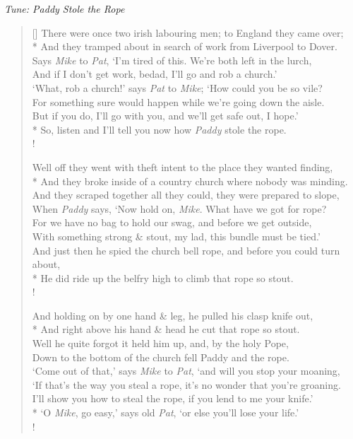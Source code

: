 \documentclass[MAIN]{subfiles}
\begin{document}
\begin{center}
\emph{Tune: Paddy Stole the Rope}
\end{center}

\bigskip

\settowidth{\versewidth}{There were once two irish labouring men; to England they came over;}
\begin{verse}[\versewidth]
There were once two irish labouring men; to England they came over;\\*
And they tramped about in search of work from {\sc Liverpool} to {\sc Dover}.\\
Says \emph{Mike} to \emph{Pat}, `I'm tired of this. We're both left in the lurch,\\
And if I don't get work, bedad, I'll go and rob a church.'\\
`What, rob a church!' says \emph{Pat} to \emph{Mike}; `How could you be so vile?\\
For something sure would happen while we're going down the aisle.\\
But if you do, I'll go with you, and we'll get safe out, I hope.'\\*
So, listen and I'll tell you now how \emph{Paddy} stole the rope.\\!

Well off they went with theft intent to the place they wanted finding,\\*
And they broke inside of a country church where nobody was minding.\\
And they scraped together all they could, they were prepared to slope,\\
When \emph{Paddy} says, `Now hold on, \emph{Mike}. What have we got for rope?\\
For we have no bag to hold our swag, and before we get outside,\\
With something strong \& stout, my lad, this bundle must be tied.'\\
And just then he spied the church bell rope, and before you could turn about,\\*
He did ride up the belfry high to climb that rope so stout.\\!

And holding on by one hand \& leg, he pulled his clasp knife out,\\*
And right above his hand \& head he cut that rope so stout.\\
Well he quite forgot it held him up, and, by the holy Pope,\\
Down to the bottom of the church fell Paddy and the rope.\\
`Come out of that,' says \emph{Mike} to \emph{Pat}, `and will you stop your moaning,\\
`If that's the way you steal a rope, it's no wonder that you're groaning.\\
I'll show you how to steal the rope, if you lend to me your knife.'\\*
`O \emph{Mike}, go easy,' says old \emph{Pat}, `or else you'll lose your life.'\\!


\end{verse}
\end{document}
